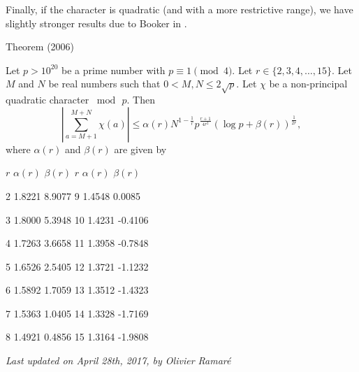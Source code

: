 Finally, if the character is quadratic (and with a more restrictive
range), we have slightly stronger results due to Booker in  
\cite{Booker*06}.
\par 
\begin{thm}{Theorem (2006)}

Let $p > 10^{20}$ be a prime number with $p \equiv 1 \pmod{4}$. Let
$r\in \{2,3,4,\ldots,15\}$. Let $M$ and $N$ be real numbers such that
$0 < M , N \le 2\sqrt{p}$. Let $\chi$ be a non-principal quadratic
character $\bmod{\,p}$.  Then
$$
\left|\sum_{a=M+1}^{M+N}\chi(a)\right|
\le \alpha(r) N^{1-\frac{1}{r}} p^{\frac{r+1}{4r^2}}\left(\log{p} +
     \beta(r)\right)^{\frac{1}{2r}},
$$
     where $\alpha(r)$ and $\beta(r)$ are given by

  
  
    
      $r$
      $\alpha(r)$
      $\beta(r)$
      $r$
      $\alpha(r)$
      $\beta(r)$
    
  
  
    2
    1.8221
    8.9077
    9
    1.4548
    0.0085
  
  
    3
    1.8000
    5.3948
    10
    1.4231
    -0.4106
  
  
    4
    1.7263
    3.6658
    11
    1.3958
    -0.7848
  
  
    5
    1.6526
    2.5405
    12
    1.3721
    -1.1232
  
  
    6
    1.5892
    1.7059
    13
    1.3512
     -1.4323
  
  
    7
    1.5363
    1.0405
    14
    1.3328
    -1.7169
  
  
    8
     1.4921
    0.4856
    15
    1.3164
    -1.9808
  
  

\end{thm}

     

 
 








  
\begin{flushright}\small\sl{}   Last updated on April 28th, 2017, by Olivier Ramar\'e
 \end{flushright}















